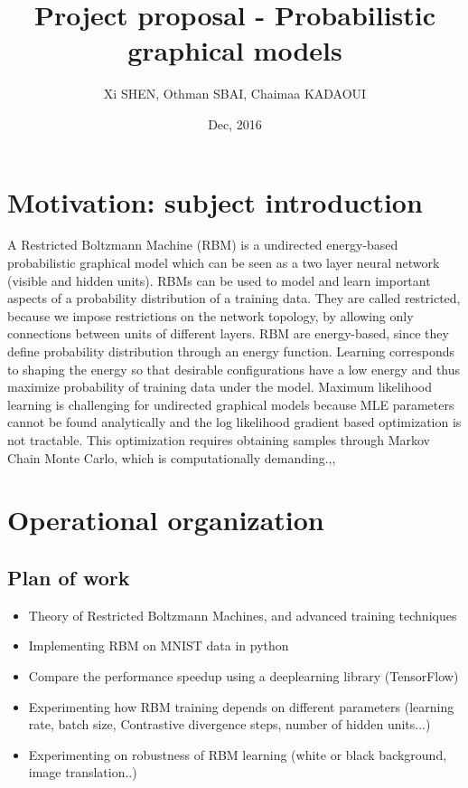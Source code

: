 \documentclass[a4paper,10pt]{article}
\title{Project proposal - Probabilistic graphical models}
\author{Xi SHEN, Othman SBAI, Chaimaa KADAOUI}
\date{Dec, 2016}
\begin{document}
\maketitle
\section{Motivation: subject introduction}
A Restricted Boltzmann Machine (RBM) is a undirected energy-based probabilistic graphical model which can be seen as a two layer neural network (visible and hidden units). RBMs can be used to model and learn important aspects of a probability distribution of a training data. They are called restricted, because we impose restrictions on the network topology, by allowing only connections between units of different layers. RBM are energy-based, since they define probability distribution through an energy function. Learning corresponds to shaping the energy so that desirable configurations have a low energy and thus maximize probability of training data under the model. Maximum likelihood learning is challenging for undirected graphical models because MLE parameters cannot be found analytically and the log likelihood gradient based optimization is not tractable. This optimization requires obtaining samples through Markov Chain Monte Carlo, which is computationally demanding.\cite{hinton2010practical},\cite{tieleman2008training},\cite{fischer2014training}

\section{Operational organization}
\subsection{Plan of work}
\begin{itemize}
    \setlength{\itemsep}{3pt}
    \setlength{\parskip}{0pt}
    \item Theory of Restricted Boltzmann Machines, and advanced training techniques
	\item Implementing RBM on MNIST data in python
	\item Compare the performance speedup using a deeplearning library (TensorFlow)
	\item Experimenting how RBM training depends on different parameters (learning rate, batch size, Contrastive divergence steps, number of hidden units...)
	\item Experimenting on robustness of RBM learning (white or black background, image translation..)
\end{itemize}
\end{document}

